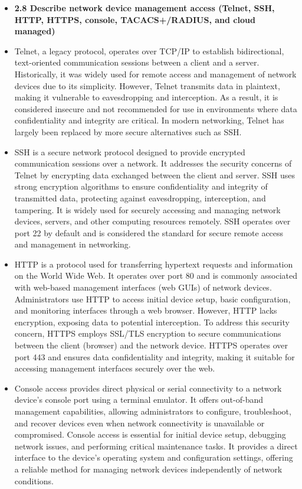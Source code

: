 \documentclass{article}
\begin{document}
\begin{itemize}
  \item \textbf{2.8 Describe network device management access (Telnet, SSH, HTTP, HTTPS, console, TACACS+/RADIUS, and cloud managed)}
  	\item[] Telnet, a legacy protocol, operates over TCP/IP to establish bidirectional, text-oriented communication sessions between a client and a server. Historically, it was widely used for remote access and management of network devices due to its simplicity. However, Telnet transmits data in plaintext, making it vulnerable to eavesdropping and interception. As a result, it is considered insecure and not recommended for use in environments where data confidentiality and integrity are critical. In modern networking, Telnet has largely been replaced by more secure alternatives such as SSH.
	\item[] SSH is a secure network protocol designed to provide encrypted communication sessions over a network. It addresses the security concerns of Telnet by encrypting data exchanged between the client and server. SSH uses strong encryption algorithms to ensure confidentiality and integrity of transmitted data, protecting against eavesdropping, interception, and tampering. It is widely used for securely accessing and managing network devices, servers, and other computing resources remotely. SSH operates over port 22 by default and is considered the standard for secure remote access and management in networking.
	\item[] HTTP is a protocol used for transferring hypertext requests and information on the World Wide Web. It operates over port 80 and is commonly associated with web-based management interfaces (web GUIs) of network devices. Administrators use HTTP to access initial device setup, basic configuration, and monitoring interfaces through a web browser. However, HTTP lacks encryption, exposing data to potential interception. To address this security concern, HTTPS employs SSL/TLS encryption to secure communications between the client (browser) and the network device. HTTPS operates over port 443 and ensures data confidentiality and integrity, making it suitable for accessing management interfaces securely over the web.
	\item[] Console access provides direct physical or serial connectivity to a network device's console port using a terminal emulator. It offers out-of-band management capabilities, allowing administrators to configure, troubleshoot, and recover devices even when network connectivity is unavailable or compromised. Console access is essential for initial device setup, debugging network issues, and performing critical maintenance tasks. It provides a direct interface to the device's operating system and configuration settings, offering a reliable method for managing network devices independently of network conditions.

\end{itemize}
\end{document}
